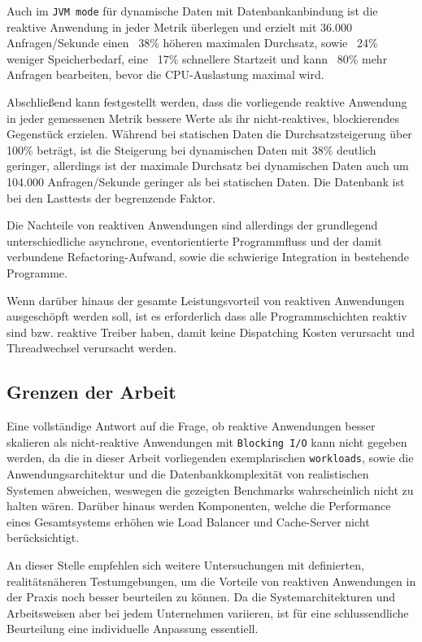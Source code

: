 Auch im \verb|JVM mode| für dynamische Daten mit Datenbankanbindung ist die reaktive Anwendung in jeder Metrik überlegen und erzielt
mit 36.000 Anfragen/Sekunde einen ~38\% höheren maximalen Durchsatz, sowie ~24\% weniger Speicherbedarf, eine ~17\% schnellere
Startzeit und kann ~80\% mehr Anfragen bearbeiten, bevor die CPU-Auslastung maximal wird.

Abschließend kann festgestellt werden, dass die vorliegende reaktive Anwendung in jeder gemessenen Metrik bessere Werte als ihr
nicht-reaktives, blockierendes Gegenstück erzielen. Während bei statischen Daten die Durchsatzsteigerung über 100\% beträgt, ist die
Steigerung bei dynamischen Daten mit 38\% deutlich geringer, allerdings ist der maximale Durchsatz bei dynamischen Daten auch
um 104.000 Anfragen/Sekunde geringer als bei statischen Daten. Die Datenbank ist bei den Lasttests der begrenzende Faktor.

Die Nachteile von reaktiven Anwendungen sind allerdings der grundlegend unterschiedliche asynchrone, eventorientierte Programmfluss
und der damit verbundene Refactoring-Aufwand, sowie die schwierige Integration in bestehende Programme.

Wenn darüber hinaus der gesamte Leistungsvorteil von reaktiven Anwendungen ausgeschöpft werden soll, ist es erforderlich
dass alle Programmschichten reaktiv sind bzw. reaktive Treiber haben, damit keine Dispatching Kosten verursacht und Threadwechsel
verursacht werden.

\subsection{Grenzen der Arbeit}
\label{subsec:grenzen_der_arbeit}
Eine vollständige Antwort auf die Frage, ob reaktive Anwendungen besser skalieren als nicht-reaktive Anwendungen
mit \verb|Blocking I/O| kann nicht gegeben werden, da die in dieser Arbeit vorliegenden exemplarischen \verb|workloads|, sowie
die Anwendungsarchitektur und die Datenbankkomplexität von realistischen Systemen abweichen, weswegen die gezeigten Benchmarks
wahrscheinlich nicht zu halten wären.
Darüber hinaus werden Komponenten, welche die Performance eines Gesamtsystems erhöhen wie Load Balancer und Cache-Server
nicht berücksichtigt.

An dieser Stelle empfehlen sich weitere Untersuchungen mit definierten, realitätsnäheren Testumgebungen, um die Vorteile
von reaktiven Anwendungen in der Praxis noch besser beurteilen zu können.
Da die Systemarchitekturen und Arbeitsweisen aber bei jedem Unternehmen variieren, ist für eine schlussendliche Beurteilung
eine individuelle Anpassung essentiell.

